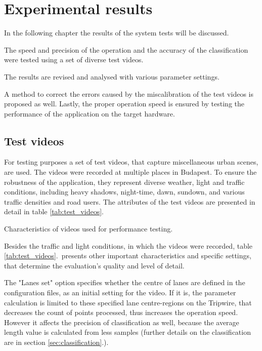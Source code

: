 \chapter{Experimental results}\label{chap:Tests}
In the following chapter the results of the system tests will be discussed. 

The speed and precision of the operation and the accuracy of the classification were tested using a set of diverse test videos.

The results are revised and analysed with various parameter settings.

A method to correct the errors caused by the miscalibration of the test videos is proposed as well.
Lastly, the proper operation speed is ensured by testing the performance of the application on the target hardware.

\section{Test videos}\label{sec:test_videos}
For testing purposes a set of test videos, that capture miscellaneous urban scenes, are used.
The videos were recorded at multiple places in Budapest.
To ensure the robustness of the application, they represent diverse weather, light and traffic conditions, including heavy shadows, night-time, dawn, sundown, and various traffic densities and road users.
The attributes of the test videos are presented in detail in table \ref{tab:test_videos}.

\begin{table}[!h]
	\begin{adjustbox}{center}
	\end{adjustbox}
	\caption{Characteristics of videos used for performance testing.}
	\label{tab:test_videos}
\end{table}

Besides the traffic and light conditions, in which the videos were recorded, table \ref{tab:test_videos}.~presents other important characteristics and specific settings, that determine the evaluation's quality and level of detail.

The "Lanes set" option specifies whether the centre of lanes are defined in the configuration files, as an initial setting for the video.
If it is, the parameter calculation is limited to these specified lane centre-regions on the Tripwire, that decreases the count of points processed, thus increases the operation speed.
However it affects the precision of classification as well, because the average length value is calculated from less samples (further details on the classification are in section \ref{sec:classification}.).


